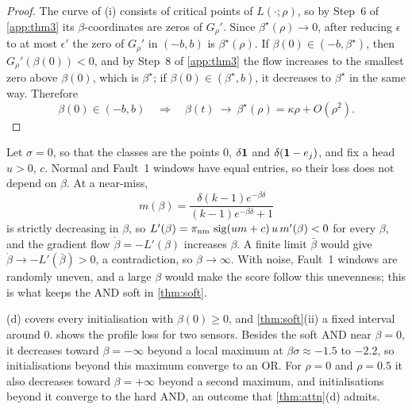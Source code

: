 \begin{proof}
 The curve of (i) consists of critical points of $L(\cdot;\rho)$, so by Step~6 of \cref{app:thm3} its $\beta$-coordinates are zeros of $G_\rho'$. Since $\beta^\star(\rho)\to0$, after reducing $\epsilon$ to at most $\epsilon'$ the zero of $G_\rho'$ in $(-b,b)$ is $\beta^\star(\rho)$. If $\beta(0)\in(-b,\beta^\star)$, then $G_\rho'(\beta(0))<0$, and by Step~8 of \cref{app:thm3} the flow increases to the smallest zero above $\beta(0)$, which is $\beta^\star$; if $\beta(0)\in(\beta^\star,b)$, it decreases to $\beta^\star$ in the same way. Therefore
\begin{equation}\label{eq:basin}
  \boxed{\;\beta(0)\in(-b,b)\quad\Longrightarrow\quad\beta(t)\ \longrightarrow\ \beta^\star(\rho)=\kappa\rho+O(\rho^2).\;}
\end{equation}
\end{proof}

\begin{remark}\label{rem:hard}
Let $\sigma=0$, so that the classes are the points $0$, $\delta\mathbf{1}$ and $\delta(\mathbf{1}-e_j)$, and fix a head $u>0$, $c$. Normal and Fault~1 windows have equal entries, so their loss does not depend on $\beta$. At a near-miss,
\begin{equation}\label{eq:hard}
  m(\beta)=\frac{\delta(k-1)e^{-\beta\delta}}{(k-1)e^{-\beta\delta}+1}
\end{equation}
is strictly decreasing in $\beta$, so $L'(\beta)=\pi_{\mathrm{nm}}\,\operatorname{sig}(um+c)\,u\,m'(\beta)<0$ for every $\beta$, and the gradient flow $\dot\beta=-L'(\beta)$ increases $\beta$. A finite limit $\bar\beta$ would give $\dot\beta\to-L'(\bar\beta)>0$, a contradiction, so $\beta\to\infty$. With noise, Fault~1 windows are randomly uneven, and a large $\beta$ would make the score follow this unevenness; this is what keeps the AND soft in \cref{thm:soft}.
\end{remark}

\begin{remark}\label{rem:far}
(d) covers every initialisation with $\beta(0)\ge0$, and \cref{thm:soft}(ii) a fixed interval around $0$.  shows the profile loss for two sensors. Besides the soft AND near $\beta=0$, it decreases toward $\beta=-\infty$ beyond a local maximum at $\beta\sigma\approx-1.5$ to $-2.2$, so initialisations beyond this maximum converge to an OR. For $\rho=0$ and $\rho=0.5$ it also decreases toward $\beta=+\infty$ beyond a second maximum, and initialisations beyond it converge to the hard AND, an outcome that \cref{thm:attn}(d) admits.
\end{remark}

